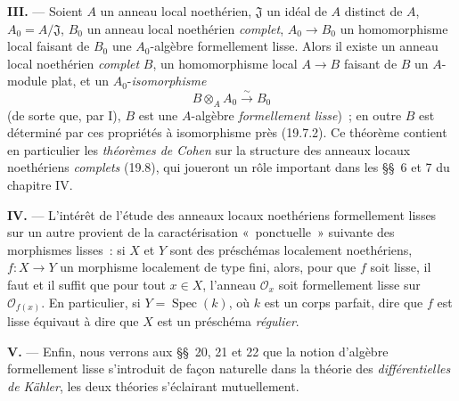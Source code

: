 \begin{env}[19.0.2]
\medskip\noindent\textbf{III.} --- Soient $A$ un anneau local noethérien,
$\mathfrak J$ un idéal de $A$ distinct de $A$, $A_0=A/\mathfrak J$, $B_0$ un
anneau local noethérien \emph{complet}, $A_0\to B_0$ un homomorphisme local
faisant de $B_0$ une $A_0$-algèbre formellement lisse. Alors il existe un
anneau local noethérien \emph{complet} $B$, un homomorphisme local $A\to B$
faisant de $B$ un $A$-module plat, et un $A_0$-\emph{isomorphisme}
\[
  B\otimes_A A_0\xrightarrow{\sim}B_0
\]
(de sorte que, par I), $B$ est une $A$-algèbre \emph{formellement lisse})~; en
outre $B$ est déterminé par ces propriétés à isomorphisme près (19.7.2). Ce
théorème contient en particulier les \emph{théorèmes de Cohen} sur la structure
des anneaux locaux noethériens \emph{complets} (19.8), qui joueront un rôle
important dans les §§~6 et 7 du chapitre IV.

\medskip\noindent\textbf{IV.} --- L'intérêt de l'étude des anneaux locaux
noethériens formellement lisses sur un autre provient de la caractérisation
«~ponctuelle~» suivante des morphismes lisses~: si $X$ et $Y$ sont des
préschémas localement noethériens, $f:X\to Y$ un morphisme localement de type
fini, alors, pour que $f$ soit lisse, il faut et il suffit que pour tout
$x\in X$, l'anneau $\mathcal O_x$ soit formellement lisse sur
$\mathcal O_{f(x)}$. En particulier, si $Y=\operatorname{Spec}(k)$, où $k$ est
un corps parfait, dire que $f$ est lisse équivaut à dire que $X$ est un
préschéma \emph{régulier}.

\medskip\noindent\textbf{V.} --- Enfin, nous verrons aux §§~20, 21 et 22 que
la notion d'algèbre formellement lisse s'introduit de façon naturelle dans la
théorie des \emph{différentielles de Kähler}, les deux théories s'éclairant
mutuellement.
\end{env}

